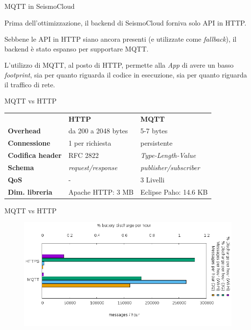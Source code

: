 \begin{frame}[c]{MQTT in SeismoCloud}

Prima dell'ottimizzazione, il backend di SeismoCloud forniva solo API in HTTP.

\vspace{0.5cm}
Sebbene le API in HTTP siano ancora presenti (e utilizzate come \textit{fallback}), il backend è stato espanso per supportare MQTT.

\vspace{0.5cm}
L'utilizzo di MQTT, al posto di HTTP, permette alla \textit{App} di avere un basso \textit{footprint}, sia per quanto riguarda il codice in esecuzione, sia per quanto riguarda il traffico di rete.

\end{frame}

\begin{frame}[c]{MQTT vs HTTP}

\begin{table}[h]
\centering
\begin{tabular}{lll}
                    & \textbf{HTTP} & \textbf{MQTT} \\
\textbf{Overhead} & da 200 a 2048 bytes & 5-7 bytes \\
\textbf{Connessione} & 1 per richiesta & persistente \\
\textbf{Codifica header} & RFC 2822 & \textit{Type-Length-Value} \\
\textbf{Schema} & \textit{request/response} & \textit{publisher/subscriber} \\
\textbf{QoS} & - & 3 Livelli \\
\textbf{Dim. libreria} & Apache HTTP: 3 MB & Eclipse Paho: 14.6 KB \\
\end{tabular}
\end{table}

\end{frame}

\begin{frame}[c]{MQTT vs HTTP}

\begin{figure}[ht]
\centering
\includegraphics[width=\textwidth]{database/networkperformance0}
\end{figure}

\end{frame}

